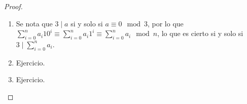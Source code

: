 \documentclass{ayudantia}
\begin{document}
\begin{proof}
    \begin{enumerate}
        \item Se nota que \(3\mid a\) si y solo si \(a\equiv 0\mod 3\), por lo que \(\sum_{i=0}^na_i10^i\equiv\sum_{i=0}^na_i1^i\equiv\sum_{i=0}^na_i\mod n\), lo que es cierto si y solo si \(3\mid\sum_{i=0}^na_i\).
        \item Ejercicio.
        \item Ejercicio.
    \end{enumerate}
\end{proof}
\end{document}
